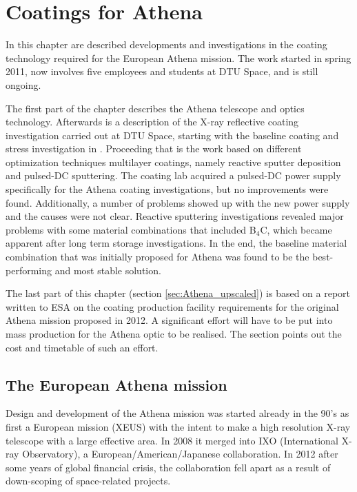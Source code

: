 \chapter{Coatings for Athena}\label{chap:Athena_coatings}
In this chapter are described developments and investigations in the coating technology required for the European Athena mission. The work started in spring 2011, now involves five employees and students at DTU Space, and is still ongoing.

The first part of the chapter describes the Athena telescope and optics technology. Afterwards is a description of the X-ray reflective coating investigation carried out at DTU Space, starting with the baseline coating and stress investigation in \cite{Jakobsen:2011vd}. Proceeding that is the work based on different optimization techniques multilayer coatings, namely reactive sputter deposition and pulsed-DC sputtering. The coating lab acquired a pulsed-DC power supply specifically for the Athena coating investigations, but no improvements were found. Additionally, a number of problems showed up with the new power supply and the causes were not clear. Reactive sputtering investigations revealed major problems with some material combinations that included B$_4$C, which became apparent after long term storage investigations. In the end, the baseline material combination that was initially proposed for Athena was found to be the best-performing and most stable solution.

The last part of this chapter (section \ref{sec:Athena_upscaled}) is based on a report written to ESA on the coating production facility requirements for the original Athena mission proposed in 2012. A significant effort will have to be put into mass production for the Athena optic to be realised. The section points out the cost and timetable of such an effort.

\section{The European Athena mission}
Design and development of the Athena mission was started already in the 90's as first a European mission (XEUS) with the intent to make a high resolution X-ray telescope with a large effective area. In 2008 it merged into IXO (International X-ray Observatory), a European/American/Japanese collaboration. In 2012 after some years of global financial crisis, the collaboration fell apart as a result of down-scoping of space-related projects.

